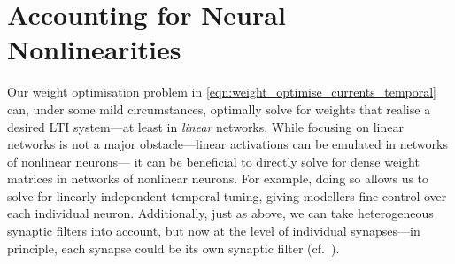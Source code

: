 
\section{Accounting for Neural Nonlinearities}
\label{sec:recurrent_weights}

Our weight optimisation problem in \cref{eqn:weight_optimise_currents_temporal} can, under some mild circumstances, optimally solve for weights that realise a desired LTI system---at least in \emph{linear} networks.
While focusing on linear networks is not a major obstacle---linear activations can be emulated in networks of nonlinear neurons---%
%
%
it can be beneficial to directly solve for dense weight matrices in networks of nonlinear neurons.
For example, doing so allows us to solve for linearly independent temporal tuning, giving modellers fine control over each individual neuron.
Additionally, just as above, we can take heterogeneous synaptic filters into account, but now at the level of individual synapses---in principle, each synapse could be its own synaptic filter (cf.~).

